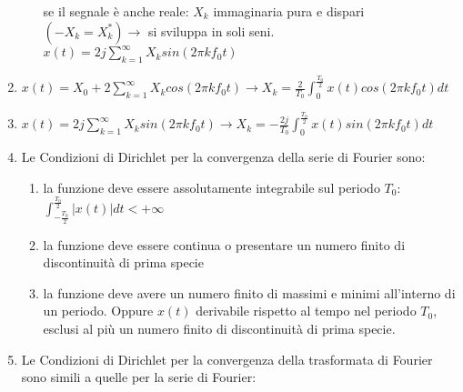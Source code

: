 \documentclass[12pt
]{article}
\providecommand{\tightlist}{%
  \setlength{\itemsep}{0pt}\setlength{\parskip}{0pt}}
\begin{document}
\begin{enumerate}
\begin{enumerate}
		se il segnale è anche reale: $X_k$ immaginaria pura e dispari $(-X_k = X^*_k) \to $ si sviluppa in soli seni.\newline
		$\displaystyle x(t)= 2j \sum_{k=1}^{\infty} X_k sin (2\pi k f_0 t)$
	\end{enumerate}
	\item
	$ \displaystyle x(t)=X_0 + 2\sum_{k=1}^{\infty} X_k cos (2\pi k f_0 t) \to
	X_k = \frac{2}{T_0} \int_{0}^{\frac{T_0}{2}} x(t) cos (2\pi k f_0 t) dt$
	\item
	$\displaystyle x(t)= 2j \sum_{k=1}^{\infty} X_k sin (2\pi k f_0 t) \to
	X_k = -\frac{2j}{T_0} \int_{0}^{\frac{T_0}{2}} x(t) sin (2\pi k f_0 t)dt$
	\item
	Le Condizioni di Dirichlet per la convergenza della serie di Fourier sono:	
	\begin{enumerate}
		\def\labelenumii{(\alph{enumii})}
		\tightlist
		\item
		la funzione deve essere assolutamente integrabile sul periodo $T_0$: $\displaystyle \int_{-\frac{T_0}{2}}^{\frac{T_0}{2}} |x(t)| dt < +\infty$
		\item
		la funzione deve essere continua o presentare un numero finito di discontinuità di prima specie
		\item
		la funzione deve avere un numero finito di massimi e minimi
		all'interno di un periodo. Oppure  $x(t)$ derivabile rispetto al tempo nel periodo $T_0$, esclusi al più un numero finito di discontinuità di prima specie.
	\end{enumerate}
	\item
	Le Condizioni di Dirichlet per la convergenza della trasformata di
	Fourier sono simili a quelle per la serie di Fourier:
	

\end{enumerate}
\end{document}
